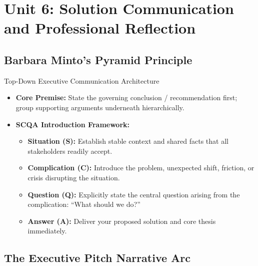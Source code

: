 \chapter{Unit 6: Solution Communication and Professional Reflection}
\label{chap:unit6-communication-reflection}

\section{Barbara Minto's Pyramid Principle}

\begin{frameworkbox}{Top-Down Executive Communication Architecture}
\begin{itemize}
    \item \textbf{Core Premise:} State the governing conclusion / recommendation first; group supporting arguments underneath hierarchically.
    \item \textbf{SCQA Introduction Framework:}
    \begin{itemize}
        \item \textbf{Situation (S):} Establish stable context and shared facts that all stakeholders readily accept.
        \item \textbf{Complication (C):} Introduce the problem, unexpected shift, friction, or crisis disrupting the situation.
        \item \textbf{Question (Q):} Explicitly state the central question arising from the complication: ``What should we do?''
        \item \textbf{Answer (A):} Deliver your proposed solution and core thesis immediately.
    \end{itemize}
\end{itemize}
\end{frameworkbox}

\section{The Executive Pitch Narrative Arc}

